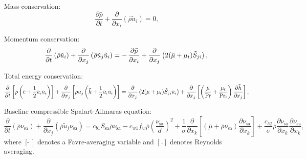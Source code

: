 \documentclass[10pt]{article}
\newcommand{\pp}[2]{\frac{\partial #1}{\partial #2}}
\newcommand{\sa}{\nu_{\mathrm{sa}}}
\begin{document}
Mass conservation:
\begin{equation}\label{eq:ns01}
\pp{\bar{\rho}}{t} + \pp{}{x_i} (\bar{\rho}\tilde{u}_i) = 0, 
\end{equation}

Momentum conservation:
\begin{equation}\label{eq:ns02}
\pp{}{t} \left(\bar{\rho} \tilde{u}_i \right) + \pp{}{x_j} \left(\bar{\rho} \tilde{u}_j \tilde{u}_i  \right) = - \, \pp{\bar{p}}{x_i} + \pp{}{x_j}\left( 2 (\bar{\mu} + \mu_t) \tilde{S}_{ji} \right), \\
\end{equation}

Total energy conservation:
\begin{equation}\label{eq:ns03}
\pp{}{t} \left[ \bar{\rho} \left( \tilde{e} + \frac{1}{2} \tilde{u}_i \tilde{u}_i \right) \right] + \pp{}{x_j} \left[ \bar{\rho} \tilde{u}_j \left( \tilde{h} + \frac{1}{2} \tilde{u}_i \tilde{u}_i \right) \right] =  \pp{}{x_j} \left( 2 (\bar{\mu} + \mu_t) \tilde{S}_{ji} \tilde{u}_i \right) + \pp{}{x_j} \left[ \left( \frac{\bar{\mu}}{\Pr} + \frac{\mu_t}{\Pr_t} \right) \pp{\tilde{h}}{x_j} \right], \\
\end{equation}

Baseline compressible Spalart-Allmaras equation:
\begin{equation}\label{eq:ns04}
\pp{}{t}(\bar{\rho} \sa) + \pp{}{x_j} (\bar{\rho} \tilde{u}_j \sa) =  c_{b1} S_{\mathrm{sa}} \bar{\rho} \sa - c_{w1} f_w \bar{\rho} \left( \frac{\sa}{d} \right)^2 + \frac{1}{\sigma} \pp{}{x_k} \left[ (\bar{\mu} + \bar{\rho} \sa) \pp{\sa}{x_k} \right] + \frac{c_{b2}}{\sigma} \bar{\rho} \pp{\sa}{x_k} \pp{\sa}{x_k},
\end{equation}
%
where $[\tilde{\,\,}]$ denotes a Favre-averaging variable and $[\bar{\,\,}]$ denotes Reynolds averaging.
\end{document}
